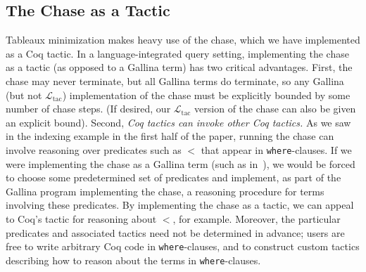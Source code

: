 \documentclass[preprint]{sigplanconf}
\newcommand{\ltac}[0]{\ensuremath{\mathcal{L}_{\mathrm{tac}}}}
\begin{document}
\begin{comment}

The final result of normalization for the movies query is exactly the query presented in Section~\ref{sec:example}.
In our syntax:
\begin{coq}
query (Mprod Movies Movies)
      (fun x => (fst x).(title) = (snd x).(title))
      (fun x => ((fst x).(director), (snd x).(actor)))
\end{coq}
\end{comment}


\subsection{The Chase as a Tactic}
\label{sec:ltac-chase}

Tableaux minimization makes heavy use of the chase, which we have implemented as a Coq tactic.  In a language-integrated query setting, implementing the chase as a tactic (as opposed to a Gallina term) has two critical advantages.  First, the chase may never terminate, but all Gallina terms do terminate, so any Gallina (but not \ltac{}) implementation of the chase must be explicitly bounded by some number of chase steps. (If desired, our \ltac{} version of the chase can also be given an explicit bound). Second, {\it Coq tactics can invoke other Coq tactics.}  As we saw in the indexing example in the first half of the paper, running the chase can involve reasoning over predicates such as $<$ that appear in {\tt where}-clauses.
If we were implementing the chase as a Gallina term (such as in~\cite{coqdb}), we would be forced to choose some predetermined set of predicates and implement, as part of the Gallina program implementing the chase, a reasoning procedure for terms involving these predicates.  By implementing the chase as a tactic, we can appeal to Coq's  tactic for reasoning about $<$, for example.  Moreover, the particular predicates and associated tactics need not be determined in advance; users are free to write arbitrary Coq code in {\tt where}-clauses, and to construct custom tactics describing how to reason about the terms in {\tt where}-clauses.
\end{document}

